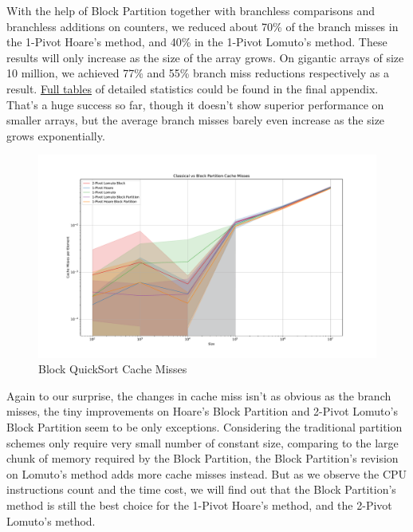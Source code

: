 \documentclass{article}
\begin{document}
With the help of Block Partition together with branchless comparisons and branchless additions on counters, we reduced about 70\% of the branch misses in the 1-Pivot Hoare's method, and 40\% in the 1-Pivot Lomuto's method. These results will only increase as the size of the array grows.
On gigantic arrays of size 10 million, we achieved 77\% and 55\% branch miss reductions respectively as a result. \hyperlink{FullTables}{Full tables} of detailed statistics could be found in the final appendix. That's a huge success so far, though it doesn't show superior performance on smaller arrays, but the average branch misses barely even increase as the size grows exponentially.

\begin{figure}[H]
    \hypertarget{fig:blockcachemiss}{}
    \caption{Block QuickSort Cache Misses}
    \centering
    \hspace*{-0.27\textwidth}
    \includegraphics[width=1.5\textwidth]{Classical vs Block Partition Cache Misses.pdf}
\end{figure}

Again to our surprise, the changes in cache miss isn't as obvious as the branch misses, the tiny improvements on Hoare's Block Partition and 2-Pivot Lomuto's Block Partition seem to be only exceptions.
Considering the traditional partition schemes only require very small number of constant size, comparing to the large chunk of memory required by the Block Partition, the Block Partition's revision on Lomuto's method adds more cache misses instead.
But as we observe the CPU instructions count and the time cost, we will find out that the Block Partition's method is still the best choice for the 1-Pivot Hoare's method, and the 2-Pivot Lomuto's method.
\end{document}
